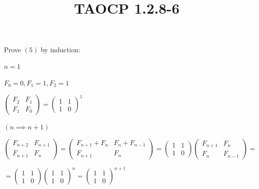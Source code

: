 \documentclass{article}
\title{TAOCP 1.2.8\mbox{-}6}
\begin{document}
\maketitle

Prove \( (5) \) by induction:

\( n = 1 \)

\( F_{0}=0, F_{1}=1, F_{2}=1 \)

\( \left(\begin{matrix}F_{2} & F_{1} \\ F_{1} & F_{0} \end{matrix}\right) = {\left(\begin{matrix}1 & 1 \\ 1 & 0 \end{matrix}\right)}^{1} \)

\( (n \implies n+1) \)

\( \left(\begin{matrix}F_{n+2} & F_{n+1} \\ F_{n+1} & F_{n} \end{matrix}\right) = \left(\begin{matrix}F_{n+1} + F_{n} & F_{n} + F_{n-1} \\ F_{n+1} & F_{n} \end{matrix}\right) = \left(\begin{matrix}1 & 1 \\ 1 & 0 \end{matrix}\right) \left(\begin{matrix}F_{n+1} & F_{n} \\ F_{n} & F_{n-1} \end{matrix}\right) = \)

\( = \left(\begin{matrix}1 & 1 \\ 1 & 0 \end{matrix}\right){\left(\begin{matrix}1 & 1 \\ 1 & 0 \end{matrix}\right)}^{n} = {\left(\begin{matrix}1 & 1 \\ 1 & 0 \end{matrix}\right)}^{n+1} \)
\end{document}
